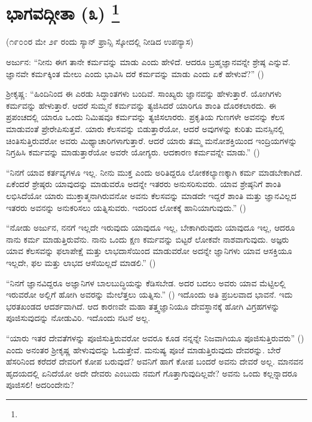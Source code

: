 
\chapter[ಭಾಗವದ್ಗೀತಾ (೩) ]{ಭಾಗವದ್ಗೀತಾ (೩) \protect\footnote{}}

\centerline{(೧೯೦೦ರ ಮೇ ೨೯ ರಂದು ಸ್ಯಾನ್​ ಫ್ರಾನ್ಸಿ ಸ್ಕೋದಲ್ಲಿ ನೀಡಿದ ಉಪನ್ಯಾಸ)}

ಅರ್ಜುನ: “ನೀನು ಈಗ ತಾನೇ ಕರ್ಮವನ್ನು ಮಾಡು ಎಂದು ಹೇಳಿದೆ. ಆದರೂ ಬ್ರಹ್ಮಜ್ಞಾನವನ್ನೇ ಶ್ರೇಷ್ಠ ಎನ್ನುವೆ. ಜ್ಞಾನವೇ ಕರ್ಮಕ್ಕಿಂತ ಮೇಲು ಎಂದು ಭಾವಿಸಿ ದರೆ ಕರ್ಮವನ್ನು ಮಾಡು ಎಂದು ಏಕೆ ಹೇಳುವೆ?” ()

ಶ‍್ರೀಕೃಷ್ಣ: “ಹಿಂದಿನಿಂದ ಈ ಎರಡು ಸಿದ್ಧಾಂತಗಳು ಬಂದಿವೆ. ಸಾಂಖ್ಯರು ಜ್ಞಾನವನ್ನು ಹೇಳುತ್ತಾರೆ. ಯೋಗಿಗಳು ಕರ್ಮವನ್ನು ಹೇಳುತ್ತಾರೆ. ಆದರೆ ಸುಮ್ಮನೆ ಕರ್ಮವನ್ನು ತ್ಯಜಿಸಿದರೆ ಯಾರಿಗೂ ಶಾಂತಿ ದೊರಕಲಾರದು. ಈ ಪ್ರಪಂಚದಲ್ಲಿ ಯಾರೂ ಒಂದು ನಿಮಿಷವೂ ಕರ್ಮವನ್ನು ತ್ಯಜಿಸಲಾರರು. ಪ್ರಕೃತಿಯ ಗುಣಗಳೇ ಅವನನ್ನು ಕೆಲಸ ಮಾಡುವಂತೆ ಪ್ರೇರೇಪಿಸುತ್ತವೆ. ಯಾರು ಕೆಲಸವನ್ನು ಬಿಡುತ್ತಾರೆಯೋ, ಆದರೆ ಅವುಗಳನ್ನು ಕುರಿತು ಮನಸ್ಸಿನಲ್ಲಿ ಚಿಂತಿಸುತ್ತಿರುವರೋ ಅವರು ಮಿಥ್ಯಾಚಾರಿಗಳಾಗುತ್ತಾರೆ. ಆದರೆ ಯಾರು ತಮ್ಮ ಮನೋಶಕ್ತಿಯಿಂದ ಇಂದ್ರಿಯಗಳನ್ನು ನಿಗ್ರಹಿಸಿ ಕರ್ಮವನ್ನು ಮಾಡುತ್ತಾರೆಯೋ ಅವರೇ ಯೋಗ್ಯರು. ಆದಕಾರಣ ಕರ್ಮವನ್ನೇ ಮಾಡು.” ()

“ನಿನಗೆ ಯಾವ ಕರ್ತವ್ಯಗಳೂ ಇಲ್ಲ. ನೀನು ಮುಕ್ತ ಎಂದು ಅರಿತಿದ್ದರೂ ಲೋಕಕಲ್ಯಾಣಕ್ಕಾಗಿ ಕರ್ಮ ಮಾಡಬೇಕಾಗಿದೆ. ಏಕೆಂದರೆ ಶ್ರೇಷ್ಠರು ಯಾವುದನ್ನು ಮಾಡುವರೊ ಅದನ್ನೇ ಇತರರು ಅನುಸರಿಸುವರು. ಯಾವ ಶ್ರೇಷ್ಠನಿಗೆ ಶಾಂತಿ ಲಭಿಸಿದೆಯೋ ಯಾರು ಮುಕ್ತಾತ್ಮನಾಗಿರುವನೋ ಅವನು ಕೆಲಸವನ್ನು ಮಾಡದೇ ಇದ್ದರೆ ಶಾಂತಿ ಮತ್ತು ಜ್ಞಾನವಿಲ್ಲದ ಇತರರು ಅವನನ್ನು ಅನುಕರಿಸಲು ಯತ್ನಿಸುವರು. ಇದರಿಂದ ಲೋಕಕ್ಕೆ ಹಾನಿಯಾಗುವುದು.” ()

“ನೋಡು ಅರ್ಜುನ, ನನಗೆ ಇಲ್ಲದೇ ಇರುವುದು ಯಾವುದೂ ಇಲ್ಲ, ಬೇಕಾಗಿರುವುದು ಯಾವುದೂ ಇಲ್ಲ, ಆದರೂ ನಾನು ಕರ್ಮ ಮಾಡುತ್ತಿರುವೆನು. ನಾನು ಒಂದು ಕ್ಷಣ ಕರ್ಮವನ್ನು ಬಿಟ್ಟರೆ ಲೋಕವೇ ನಾಶವಾಗುವುದು. ಅಜ್ಞರು ಯಾವ ಕೆಲಸವನ್ನು ಫಲಾಪೇಕ್ಷೆ ಮತ್ತು ಲಾಭದಾಸೆಯಿಂದ ಮಾಡುವರೋ ಅದನ್ನೇ ಜ್ಞಾನಿಗಳು ಯಾವ ಆಸಕ್ತಿಯೂ ಇಲ್ಲದೇ, ಫಲ ಮತ್ತು ಲಾಭದ ಆಸೆಯಿಲ್ಲದೆ ಮಾಡಲಿ.” ()

“ನಿನಗೆ ಜ್ಞಾನವಿದ್ದರೂ ಅಜ್ಞಾನಿಗಳ ಬಾಲಬುದ್ಧಿಯನ್ನು ಕೆಡಿಸಬೇಡ. ಅದರ ಬದಲು ಅವರು ಯಾವ ಮೆಟ್ಟಿಲಲ್ಲಿ ಇರುವರೋ ಅಲ್ಲಿಗೆ ಹೋಗಿ ಅವರನ್ನು ಮೇಲೆತ್ತಲು ಯತ್ನಿಸು.” () ಇದೊಂದು ಅತಿ ಪ್ರಬಲವಾದ ಭಾವನೆ. ಇದು ಭರತಖಂಡದ ಆದರ್ಶವಾಗಿದೆ. ಆದ ಕಾರಣವೇ ಮಹಾ ತತ್ತ್ವಜ್ಞಾನಿಯೂ ದೇವಸ್ಥಾನಕ್ಕೆ ಹೋಗಿ ವಿಗ್ರಹಗಳನ್ನು ಪೂಜಿಸುವುದನ್ನು ನೋಡುವಿರಿ. ಇದೊಂದು ನಟನೆ ಅಲ್ಲ.

“ಯಾರು ಇತರ ದೇವತೆಗಳನ್ನು ಪೂಜಿಸುತ್ತಿರುವರೋ ಅವರೂ ಕೂಡ ನನ್ನನ್ನೇ ನಿಜವಾಗಿಯೂ ಪೂಜಿಸುತ್ತಿರುವರು” () ಎಂದು ಅನಂತರ ಶ‍್ರೀಕೃಷ್ಣ ಹೇಳುವುದನ್ನು ಓದುತ್ತೇವೆ. ಮನುಷ್ಯ ಪೂಜೆ ಮಾಡುತ್ತಿರುವುದು ದೇವರನ್ನು. ಬೇರೆ ಹೆಸರಿನಿಂದ ಕರೆದರೆ ದೇವರಿಗೆ ಕೋಪ ಬರುವುದೆ? ಅವನಿಗೆ ಹಾಗೆ ಕೋಪ ಬಂದರೆ ಅವನು ದೇವರೆ ಅಲ್ಲ. ಮಾನವನ ಹೃದಯದಲ್ಲಿ ಏನಿದೆಯೋ ಅದೇ ದೇವರು ಎಂಬುದು ನಮಗೆ ಗೊತ್ತಾಗುವುದಿಲ್ಲವೇ? ಅವನು ಒಂದು ಕಲ್ಲನ್ನಾದರೂ ಪೂಜಿಸಲಿ! ಅದರಿಂದೇನು?

